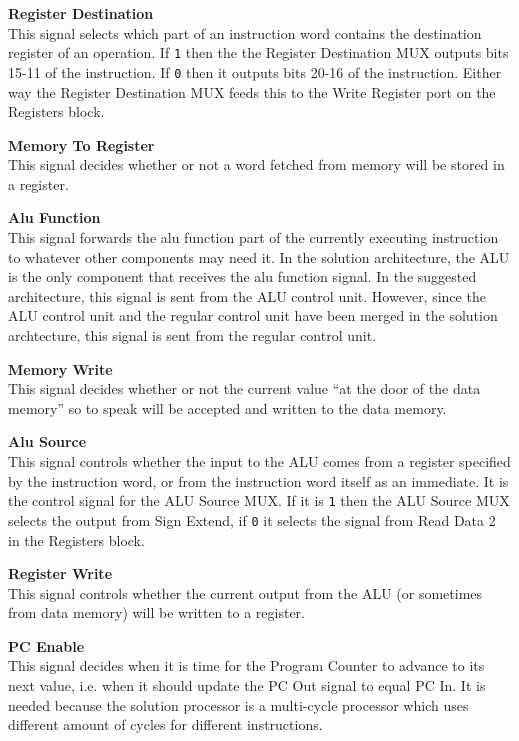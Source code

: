 \begin{description}
\item{\textbf{Register Destination}} \\
This signal selects which part of an instruction word contains the destination register of an operation.
If \texttt{1} then the the Register Destination MUX outputs bits 15-11 of the instruction. If \texttt{0} then it outputs bits 20-16 of the instruction.
Either way the Register Destination MUX feeds this to the Write Register port on the Registers block.

\item{\textbf{Memory To Register}} \\
This signal decides whether or not a word fetched from memory will be stored in a register.

\item{\textbf{Alu Function}} \\
This signal forwards the alu function part of the currently executing instruction to whatever other components may need it.
In the solution architecture, the ALU is the only component that receives the alu function signal.
In the suggested architecture, this signal is sent from the ALU control unit.
However, since the ALU control unit and the regular control unit have been merged in the solution archtecture, this signal is sent from the regular control unit.

\item{\textbf{Memory Write}} \\
This signal decides whether or not the current value ``at the door of the data memory'' so to speak will be accepted and written to the data memory.

\item{\textbf{Alu Source}} \\
This signal controls whether the input to the ALU comes from a register specified by the instruction word, or from the instruction word itself as an immediate.
It is the control signal for the ALU Source MUX.
If it is \texttt{1} then the ALU Source MUX selects the output from Sign Extend, if \texttt{0} it selects the signal from Read Data 2 in the Registers block.

\item{\textbf{Register Write}} \\
This signal controls whether the current output from the ALU (or sometimes from data memory) will be written to a register.

\item{\textbf{PC Enable}} \\
This signal decides when it is time for the Program Counter to advance to its next value, i.e. when it should update the PC Out signal to equal PC In.
It is needed because the solution processor is a multi-cycle processor which uses different amount of cycles for different instructions.


\end{description}
